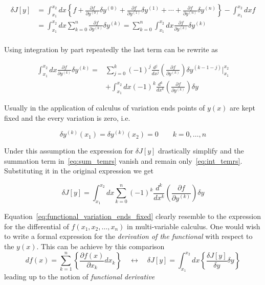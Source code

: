\begin{align*}
  \delta J[y]
  &=\int_{x_1}^{x_2} dx \left\{ f +
    \frac{\partial f}{\partial y^{(0)}} \delta y^{(0)} +
    \frac{\partial f}{\partial y^{(1)}} \delta y^{(1)} + \cdots +
    \frac{\partial f}{\partial y^{(n)}} \delta y^{(n)}
    \right\} - \int_{x_1}^{x_2} dx f \\
  &=\int_{x_1}^{x_2} dx
    \sum_{k = 0}^{n} \frac{\partial f}{\partial y^{(k)}} \delta y^{(k)}
   =\sum_{k = 0}^{n}
    \int_{x_1}^{x_2} dx \frac{\partial f}{\partial y^{(k)}} \delta y^{(k)} \\
\end{align*}

Using integration by part repeatedly the last term can be rewrite as

\begin{align}
  \label{eq:sum_temrs}
  \int_{x_1}^{x_2} dx \frac{\partial f}{\partial y^{(k)}} \delta y^{(k)} =
  & \sum_{j=0}^{k} {(-1)}^j \frac{d^j}{dx^j}
  \left( \frac{\partial f}{\partial y^{(k)}} \right) \delta y^{(k-1-j)}
  \Big|_{x_1}^{x_2} \\
  \label{eq:int_temrs}
  & + \int_{x_1}^{x_2} dx {(-1)}^k \frac{d^k}{dx^k}
  \left( \frac{\partial f}{\partial y^{(k)}}\right) \delta y
\end{align}

Usually in the application of calculus of variation ends points of $y(x)$ are
kept fixed and the every variation is zero, i.e.

\begin{equation} \label{eq:fixed_ends}
  \delta y^{(k)}(x_1) = \delta y^{(k)}(x_2) = 0  \qquad k = 0, \ldots, n
\end{equation}

Under this assumption the expression for $\delta J[y]$ drastically simplify and
the summation term in~\eqref{eq:sum_temrs} vanish and remain
only~\eqref{eq:int_temrs}. Substituting it in the original expression we get

\begin{equation} \label{eq:functional_variation_ends_fixed}
  \delta J[y] = \int_{x_1}^{x_2} dx \sum_{k = 0}^{n} {(-1)}^k \frac{d^k}{dx^k}
  \left( \frac{\partial f}{\partial y^{(k)}}\right) \delta y
\end{equation}

Equation~\eqref{eq:functional_variation_ends_fixed} clearly resemble to the
expression for the differential of $f(x_1, x_2, \ldots, x_n)$ in multi-variable
calculus. One would wish to write a formal expression for the \emph{derivation
of the functional} with respect to the $y(x)$. This can be achieve by this
comparison
\begin{equation*}
  df(x) = \sum_{k=1}^{n}
  \left\{ \frac{\partial f(x)}{\partial x_k} dx_k \right\}
  \quad \longleftrightarrow \quad
  \delta J[y] = \int_{x_1}^{x_2} dx
  \left\{ \frac{\delta J[y]}{\delta y} \delta y \right\}
\end{equation*}
leading up to the notion of \emph{functional derivative}

